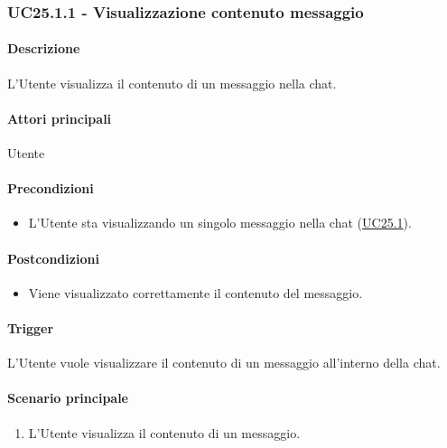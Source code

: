 
\subsubsection{UC25.1.1 - Visualizzazione contenuto messaggio}\label{UC25point1point1}
\paragraph*{Descrizione}
L'Utente visualizza il contenuto di un messaggio nella chat. 

\paragraph*{Attori principali}
Utente

\paragraph*{Precondizioni}
\begin{itemize}
  \item L'Utente sta visualizzando un singolo messaggio nella chat (\hyperref[UC25point1]{UC25.1}).
\end{itemize}

\paragraph*{Postcondizioni}
\begin{itemize}
  \item Viene visualizzato correttamente il contenuto del messaggio.
\end{itemize}

\paragraph*{Trigger}
L'Utente vuole visualizzare il contenuto di un messaggio all'interno della chat.

\paragraph*{Scenario principale}
\begin{enumerate}
  \item L'Utente visualizza il contenuto di un messaggio.
\end{enumerate}


